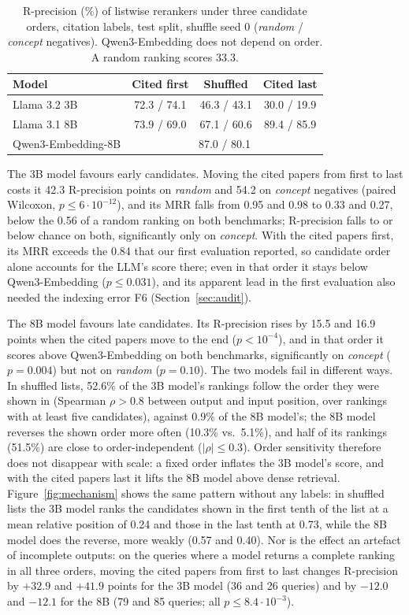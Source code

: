 \documentclass[sigconf,nonacm]{acmart}
\begin{document}
\begin{table}[t]
  \caption{R-precision (\%) of listwise rerankers under three candidate orders, citation labels, test split, shuffle seed 0 (\emph{random} / \emph{concept} negatives). Qwen3-Embedding does not depend on order. A random ranking scores 33.3.}
  \label{tab:order}
  \small
  \begin{tabular}{@{}lccc@{}}
    \toprule
    Model & Cited first & Shuffled & Cited last \\
    \midrule
    Llama 3.2 3B & 72.3 / 74.1 & 46.3 / 43.1 & 30.0 / 19.9 \\
    Llama 3.1 8B & 73.9 / 69.0 & 67.1 / 60.6 & 89.4 / 85.9 \\
    \midrule
    Qwen3-Embedding-8B & \multicolumn{3}{c}{87.0 / 80.1} \\
    \bottomrule
  \end{tabular}
\end{table}

The 3B model favours early candidates.
Moving the cited papers from first to last costs it 42.3 R-precision points on \emph{random} and 54.2 on \emph{concept} negatives (paired Wilcoxon, $p \le 6 \cdot 10^{-12}$), and its MRR falls from 0.95 and 0.98 to 0.33 and 0.27, below the 0.56 of a random ranking on both benchmarks; R-precision falls to or below chance on both, significantly only on \emph{concept}.
With the cited papers first, its MRR exceeds the 0.84 that our first evaluation reported, so candidate order alone accounts for the LLM's score there; even in that order it stays below Qwen3-Embedding ($p \le 0.031$), and its apparent lead in the first evaluation also needed the indexing error F6 (Section~\ref{sec:audit}).

The 8B model favours late candidates.
Its R-precision rises by 15.5 and 16.9 points when the cited papers move to the end ($p < 10^{-4}$), and in that order it scores above Qwen3-Embedding on both benchmarks, significantly on \emph{concept} ($p = 0.004$) but not on \emph{random} ($p = 0.10$).
The two models fail in different ways.
In shuffled lists, 52.6\% of the 3B model's rankings follow the order they were shown in (Spearman $\rho > 0.8$ between output and input position, over rankings with at least five candidates), against 0.9\% of the 8B model's; the 8B model reverses the shown order more often (10.3\% vs.\ 5.1\%), and half of its rankings (51.5\%) are close to order-independent ($|\rho| \le 0.3$).
Order sensitivity therefore does not disappear with scale: a fixed order inflates the 3B model's score, and with the cited papers last it lifts the 8B model above dense retrieval.
Figure~\ref{fig:mechanism} shows the same pattern without any labels: in shuffled lists the 3B model ranks the candidates shown in the first tenth of the list at a mean relative position of 0.24 and those in the last tenth at 0.73, while the 8B model does the reverse, more weakly (0.57 and 0.40).
Nor is the effect an artefact of incomplete outputs: on the queries where a model returns a complete ranking in all three orders, moving the cited papers from first to last changes R-precision by $+32.9$ and $+41.9$ points for the 3B model (36 and 26 queries) and by $-12.0$ and $-12.1$ for the 8B (79 and 85 queries; all $p \le 8.4 \cdot 10^{-3}$).
\end{document}
